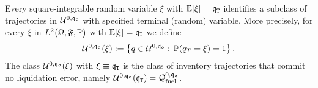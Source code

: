 \documentclass[10pt,a4paper]{article}
\begin{document}
Every square-integrable random variable $\xi$ with $\mathbb{{E}}[\xi] = \mathfrak{q}_{\mathtt{T} }$ identifies a subclass of trajectories in $\mathcal{U}^{0,\mathfrak{q_0}}$ with specified terminal (random) variable. More precisely, for every $\xi$ in $L^2\big(\Omega,\mathfrak{F}, {\mathbb{P}} \big)$ with  $\mathbb{{E}}[\xi] = \mathfrak{q}_{\mathtt{T} }$  we define 
\begin{equation*}
\mathcal{U}^{0,\mathfrak{q_0}}(\xi) := \left\lbrace
q \in \mathcal{U}^{0,\mathfrak{q_0}} : \, {\mathbb{P}}(q_T=\xi)=1 
\right\rbrace.
\end{equation*}
The class $\mathcal{U}^{0,\mathfrak{q_0}}(\xi)$ with $\xi \equiv \mathfrak{q}_{\mathtt{T} }$ is the class of inventory trajectories that commit no liquidation error, namely $\mathcal{U}^{0,\mathfrak{q_0}}(\mathfrak{q}_{\mathtt{T} }) = \mathcal{Q}_{\text{fuel}}^{0,\mathfrak{q_0}}$. 
\end{document}
